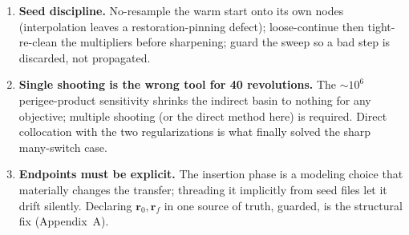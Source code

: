 \documentclass[11pt]{article}
\newcommand{\rv}{\mathbf{r}}
\begin{document}
\begin{enumerate}
        low-edge root. Check edge before picking the continuation seed.
  \item \textbf{Seed discipline.} No-resample the warm start onto its own nodes
        (interpolation leaves a restoration-pinning defect); loose-continue then
        tight-re-clean the multipliers before sharpening; guard the sweep so a
        bad step is discarded, not propagated.
  \item \textbf{Single shooting is the wrong tool for 40 revolutions.} The
        $\sim\!10^6$ perigee-product sensitivity shrinks the indirect basin to
        nothing for any objective; multiple shooting (or the direct method here)
        is required. Direct collocation with the two regularizations is what
        finally solved the sharp many-switch case.
  \item \textbf{Endpoints must be explicit.} The insertion phase is a modeling
        choice that materially changes the transfer; threading it implicitly from
        seed files let it drift silently. Declaring $\rv_0,\rv_f$ in one source of
        truth, guarded, is the structural fix (Appendix~A).
\end{enumerate}

\end{document}
